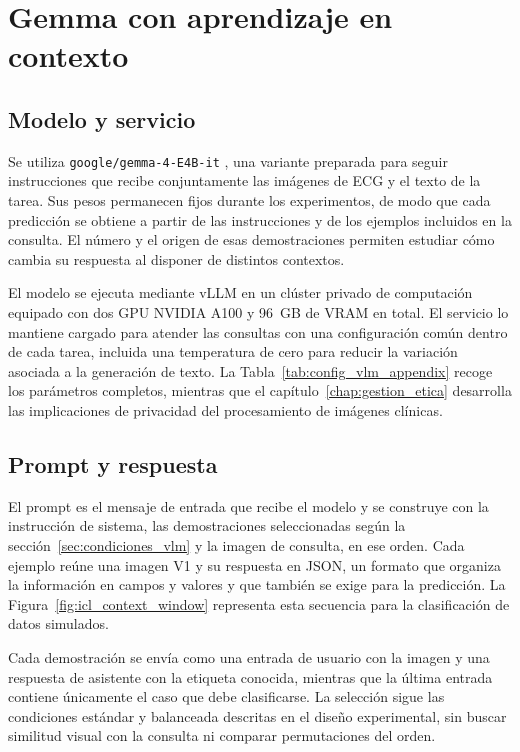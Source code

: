 \section{Gemma con aprendizaje en contexto}
\label{chap:vlm}

\subsection{Modelo y servicio}

Se utiliza \texttt{google/gemma-4-E4B-it} \cite{gemma4card}, una variante preparada para seguir instrucciones que recibe conjuntamente las imágenes de ECG y el texto de la tarea. Sus pesos permanecen fijos durante los experimentos, de modo que cada predicción se obtiene a partir de las instrucciones y de los ejemplos incluidos en la consulta. El número y el origen de esas demostraciones permiten estudiar cómo cambia su respuesta al disponer de distintos contextos.

El modelo se ejecuta mediante vLLM en un clúster privado de computación equipado con dos GPU NVIDIA A100 y 96~GB de VRAM en total. El servicio lo mantiene cargado para atender las consultas con una configuración común dentro de cada tarea, incluida una temperatura de cero para reducir la variación asociada a la generación de texto. La Tabla~\ref{tab:config_vlm_appendix} recoge los parámetros completos, mientras que el capítulo~\ref{chap:gestion_etica} desarrolla las implicaciones de privacidad del procesamiento de imágenes clínicas.

\subsection{Prompt y respuesta}

El prompt es el mensaje de entrada que recibe el modelo y se construye con la instrucción de sistema, las demostraciones seleccionadas según la sección~\ref{sec:condiciones_vlm} y la imagen de consulta, en ese orden. Cada ejemplo reúne una imagen V1 y su respuesta en JSON, un formato que organiza la información en campos y valores y que también se exige para la predicción. La Figura~\ref{fig:icl_context_window} representa esta secuencia para la clasificación de datos simulados.

Cada demostración se envía como una entrada de usuario con la imagen y una respuesta de asistente con la etiqueta conocida, mientras que la última entrada contiene únicamente el caso que debe clasificarse. La selección sigue las condiciones estándar y balanceada descritas en el diseño experimental, sin buscar similitud visual con la consulta ni comparar permutaciones del orden.

